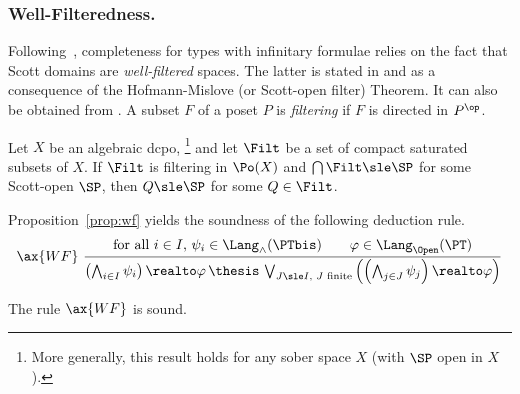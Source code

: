 \subsubsection{Well-Filteredness.}
\label{sec:wf}
Following~\cite{bk03ic},
completeness for types with infinitary formulae relies on the fact that
Scott domains are \emph{well-filtered} spaces.
The latter is stated in \cite[Corollary 7.1.11]{aj95chapter}
and \cite[Proposition 8.3.5]{goubault13book} as a consequence
of the Hofmann-Mislove (or Scott-open filter) Theorem.
It can also be obtained from \cite[Theorem 7.38]{gg24book}.
%
A subset $F$ of a poset $P$ is \emph{filtering} if $F$ is directed in $P^\op$.


\begin{proposition}
\label{prop:wf}
Let $X$ be an algebraic dcpo,%
\footnote{More generally, this result holds for any sober space $X$
(with $\SP$ open in $X$).}
and let $\Filt$ be a set of compact saturated subsets of $X$.
If $\Filt$ is filtering in $\Po(X)$
and $\bigcap \Filt \sle \SP$ for some Scott-open $\SP$,
then $Q \sle \SP$ for some $Q \in \Filt$.
\end{proposition}

Proposition~\ref{prop:wf} yields the soundness of the following deduction rule.
\[
\ax{WF}~
\dfrac{\text{for all $i\in I$, $\psi_i \in \Lang_\land(\PTbis)$}
  \qquad
  \varphi \in \Lang_\Open(\PT)}
  {
  \left( \bigwedge_{i \in I} \psi_i \right)
  \realto
  \varphi
  \,\thesis\,
  \bigvee_{\text{$J \sle I$, $J$ finite}}
  \left(
  \left( \bigwedge_{j \in J} \psi_j \right)
  \realto
  \varphi
  \right)
  }
\]

\begin{lemma}
\label{lem:wf}
The rule $\ax{WF}$ is sound.
\end{lemma}


